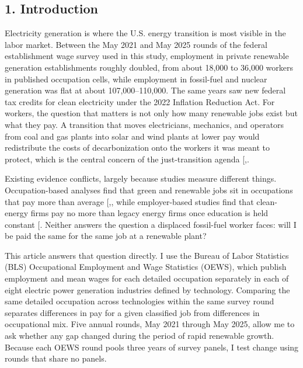 \documentclass[
  11pt,
]{article}
\begin{document}
\subsection{1. Introduction}\label{introduction}

Electricity generation is where the U.S. energy transition is most
visible in the labor market. Between the May 2021 and May 2025 rounds of
the federal establishment wage survey used in this study, employment in
private renewable generation establishments roughly doubled, from about
18,000 to 36,000 workers in published occupation cells, while employment
in fossil-fuel and nuclear generation was flat at about
107,000--110,000. The same years saw new federal tax credits for clean
electricity under the 2022 Inflation Reduction Act. For workers, the
question that matters is not only how many renewable jobs exist but what
they pay. A transition that moves electricians, mechanics, and operators
from coal and gas plants into solar and wind plants at lower pay would
redistribute the costs of decarbonization onto the workers it was meant
to protect, which is the central concern of the just-transition agenda
{[},\citeproc{ref-mccauley2018just}{2}{]}.

Existing evidence conflicts, largely because studies measure different
things. Occupation-based analyses find that green and renewable jobs sit
in occupations that pay more than average
{[},\citeproc{ref-curtis2023green}{4}{]},
while employer-based studies find that clean-energy firms pay no more
than legacy energy firms once education is held constant
{[}\citeproc{ref-colmer2025nice}{5}{]}. Neither answers the question a
displaced fossil-fuel worker faces: will I be paid the same for the same
job at a renewable plant?

This article answers that question directly. I use the Bureau of Labor
Statistics (BLS) Occupational Employment and Wage Statistics (OEWS),
which publish employment and mean wages for each detailed occupation
separately in each of eight electric power generation industries defined
by technology. Comparing the same detailed occupation across
technologies within the same survey round separates differences in pay
for a given classified job from differences in occupational mix. Five
annual rounds, May 2021 through May 2025, allow me to ask whether any
gap changed during the period of rapid renewable growth. Because each
OEWS round pools three years of survey panels, I test change using
rounds that share no panels.
\end{document}
